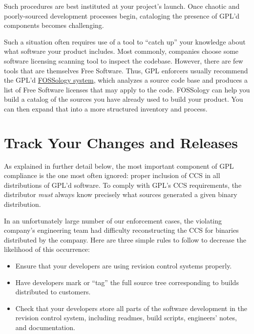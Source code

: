 Such procedures are best instituted at your project's launch.  Once 
chaotic and poorly-sourced development processes begin, cataloging the
presence of GPL'd components  becomes challenging.

Such a situation often requires use of a tool to ``catch up'' your knowledge
about what software your product includes.  Most commonly, companies choose
some software licensing scanning tool to inspect the codebase.  However,
there are few tools that are themselves Free Software.  Thus, GPL enforcers
usually recommend the GPL'd
\href{http://fossology.org/}{FOSSology system}, which analyzes a
source code base and produces a list of Free Software licenses that may apply to
the code.  FOSSology can help you build a catalog of the sources you have
already used to build your product.  You can then expand that into a more
structured inventory and process.

\section{Track Your Changes and Releases}

As explained in further detail below, the most important component of GPL
compliance is the one most often ignored: proper inclusion of CCS in all
distributions  of GPL'd
software.  To comply with GPL's CCS requirements, the distributor
\textit{must} always know precisely what sources generated a given binary
distribution.

In an unfortunately large number of our enforcement cases, the violating
company's engineering team had difficulty reconstructing the CCS
for binaries distributed by the company.  Here are three simple rules to
follow to decrease the likelihood of this occurrence:

\begin{itemize}

\item Ensure that your
developers are using revision control systems properly.

\item Have developers mark or ``tag'' the full source tree corresponding to
  builds distributed to customers.

\item Check that your developers store all parts of the software
development in the revision control system, including {\sc readme}s, build
scripts, engineers' notes, and documentation.
\end{itemize}

